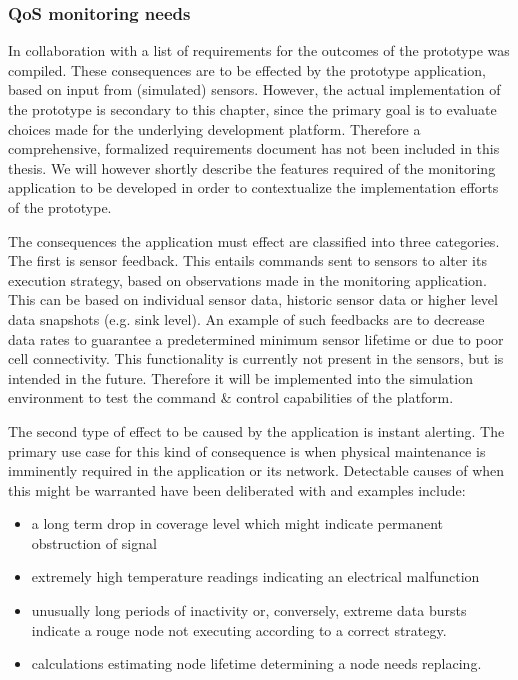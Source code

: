 \subsubsection{QoS monitoring needs}
In collaboration with \idsystems a list of requirements for the outcomes of the prototype was compiled. These consequences are to be effected by the prototype application, based on input from (simulated) sensors. However, the actual implementation of the prototype is secondary to this chapter, since the primary goal is to evaluate choices made for the underlying development platform. Therefore a comprehensive, formalized requirements document has not been included in this thesis. We will however shortly describe the features required of the monitoring application to be developed in order to contextualize the implementation efforts of the prototype.

The consequences the application must effect are classified into three categories. The first is sensor feedback. This entails commands sent to sensors to alter its execution strategy, based on observations made in the monitoring application. This can be based on individual sensor data, historic sensor data or higher level data snapshots (e.g. sink level). An example of such feedbacks are to decrease data rates to guarantee a predetermined minimum sensor lifetime or due to poor cell connectivity. This functionality is currently not present in the \nedap sensors, but is intended in the future. Therefore it will be implemented into the simulation environment to test the command \& control capabilities of the platform.

The second type of effect to be caused by the application is instant alerting. The primary use case for this kind of consequence is when physical maintenance is imminently required in the application or its network. Detectable causes of when this might be warranted have been deliberated with \idsystems and examples include:
\begin{itemize}
\nospace
\item a long term drop in coverage level which might indicate permanent obstruction of signal
\item extremely high temperature readings indicating an electrical malfunction
\item unusually long periods of inactivity or, conversely, extreme data bursts indicate a rouge node not executing according to a correct strategy.
\item calculations estimating node lifetime determining a node needs replacing.
\end{itemize}

